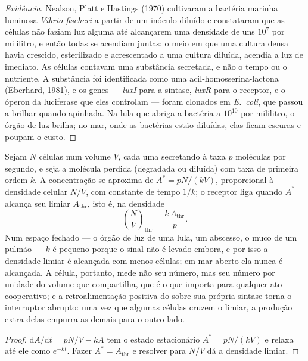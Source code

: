 \begin{proof}[Evidência]
Nealson, Platt e Hastings (1970) cultivaram a bactéria marinha luminosa
\emph{Vibrio fischeri} a partir de um inóculo diluído e constataram que
as células não faziam luz alguma até alcançarem uma densidade de uns
$10^{7}$ por mililitro, e então todas se acendiam juntas; o meio em que
uma cultura densa havia crescido, esterilizado e acrescentado a uma
cultura diluída, acendia a luz de imediato. As células contavam uma
substância secretada, e não o tempo ou o nutriente. A substância foi
identificada como uma acil-homosserina-lactona (Eberhard, 1981), e os
genes --- \emph{luxI} para a sintase, \emph{luxR} para o receptor, e o
óperon da luciferase que eles controlam --- foram clonados em
\emph{E.~coli}, que passou a brilhar quando apinhada. Na lula que
abriga a bactéria a $10^{10}$ por mililitro, o órgão de luz brilha; no
mar, onde as bactérias estão diluídas, elas ficam escuras e poupam o
custo.
\end{proof}

\begin{proposition}\label{prop:b3:bacteriology:threshold}
Sejam $N$ células num volume $V$, cada uma secretando  à
taxa $p$ moléculas por segundo, e seja a molécula perdida (degradada ou
diluída) com taxa de primeira ordem $k$. A concentração se aproxima de
$A^{*} = pN/(kV)$, proporcional à densidade celular $N/V$, com
constante de tempo $1/k$; o receptor liga quando $A^{*}$ alcança seu
limiar $A_{\text{thr}}$, isto é, na densidade
\[
\left(\frac{N}{V}\right)_{\text{thr}} = \frac{k\,A_{\text{thr}}}{p}.
\]
Num espaço fechado --- o órgão de luz de uma lula, um abscesso, o muco
de um pulmão --- $k$ é pequeno porque o sinal não é levado embora, e
por isso a densidade limiar é alcançada com menos células; em mar
aberto ela nunca é alcançada. A célula, portanto, mede não seu número,
mas seu número por unidade do volume que compartilha, que é o que
importa para qualquer ato cooperativo; e a retroalimentação positiva do
 sobre sua própria sintase torna o interruptor abrupto: uma
vez que algumas células cruzem o limiar, a produção extra delas empurra
as demais para o outro lado.
\end{proposition}
\begin{proof}
$\mathrm{d}A/\mathrm{d}t = pN/V - kA$ tem o estado estacionário
$A^{*} =
pN/(kV)$ e relaxa até ele como $e^{-kt}$. Fazer
$A^{*} = A_{\text{thr}}$ e resolver para $N/V$ dá a densidade limiar.
\end{proof}

